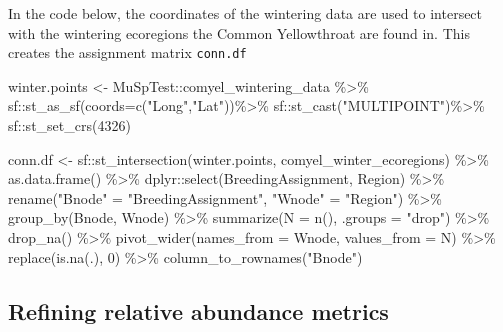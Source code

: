 \documentclass[
]{book}
\newenvironment{Shaded}{\begin{snugshade}}{\end{snugshade}}
\newcommand{\AttributeTok}[1]{\textcolor[rgb]{0.77,0.63,0.00}{#1}}
\newcommand{\DecValTok}[1]{\textcolor[rgb]{0.00,0.00,0.81}{#1}}
\newcommand{\FunctionTok}[1]{\textcolor[rgb]{0.00,0.00,0.00}{#1}}
\newcommand{\NormalTok}[1]{#1}
\newcommand{\OtherTok}[1]{\textcolor[rgb]{0.56,0.35,0.01}{#1}}
\newcommand{\SpecialCharTok}[1]{\textcolor[rgb]{0.00,0.00,0.00}{#1}}
\newcommand{\StringTok}[1]{\textcolor[rgb]{0.31,0.60,0.02}{#1}}
\begin{document}
In the code below, the coordinates of the wintering data are used to intersect with the wintering ecoregions the Common Yellowthroat are found in. This creates the assignment matrix \texttt{conn.df}

\begin{Shaded}
\begin{Highlighting}[]
\NormalTok{winter.points }\OtherTok{\textless{}{-}}\NormalTok{ MuSpTest}\SpecialCharTok{::}\NormalTok{comyel\_wintering\_data }\SpecialCharTok{\%\textgreater{}\%}
\NormalTok{  sf}\SpecialCharTok{::}\FunctionTok{st\_as\_sf}\NormalTok{(}\AttributeTok{coords=}\FunctionTok{c}\NormalTok{(}\StringTok{"Long"}\NormalTok{,}\StringTok{"Lat"}\NormalTok{))}\SpecialCharTok{\%\textgreater{}\%}
\NormalTok{  sf}\SpecialCharTok{::}\FunctionTok{st\_cast}\NormalTok{(}\StringTok{"MULTIPOINT"}\NormalTok{)}\SpecialCharTok{\%\textgreater{}\%}
\NormalTok{  sf}\SpecialCharTok{::}\FunctionTok{st\_set\_crs}\NormalTok{(}\DecValTok{4326}\NormalTok{)}

\NormalTok{conn.df }\OtherTok{\textless{}{-}}\NormalTok{ sf}\SpecialCharTok{::}\FunctionTok{st\_intersection}\NormalTok{(winter.points, comyel\_winter\_ecoregions) }\SpecialCharTok{\%\textgreater{}\%}
  \FunctionTok{as.data.frame}\NormalTok{() }\SpecialCharTok{\%\textgreater{}\%}
\NormalTok{  dplyr}\SpecialCharTok{::}\FunctionTok{select}\NormalTok{(BreedingAssignment, Region) }\SpecialCharTok{\%\textgreater{}\%}
  \FunctionTok{rename}\NormalTok{(}\StringTok{"Bnode"} \OtherTok{=} \StringTok{"BreedingAssignment"}\NormalTok{,}
         \StringTok{"Wnode"} \OtherTok{=} \StringTok{"Region"}\NormalTok{) }\SpecialCharTok{\%\textgreater{}\%}
  \FunctionTok{group\_by}\NormalTok{(Bnode, Wnode) }\SpecialCharTok{\%\textgreater{}\%}
  \FunctionTok{summarize}\NormalTok{(}\AttributeTok{N =} \FunctionTok{n}\NormalTok{(),}
            \AttributeTok{.groups =} \StringTok{"drop"}\NormalTok{) }\SpecialCharTok{\%\textgreater{}\%}
  \FunctionTok{drop\_na}\NormalTok{() }\SpecialCharTok{\%\textgreater{}\%}
  \FunctionTok{pivot\_wider}\NormalTok{(}\AttributeTok{names\_from =}\NormalTok{ Wnode, }\AttributeTok{values\_from =}\NormalTok{ N) }\SpecialCharTok{\%\textgreater{}\%}
  \FunctionTok{replace}\NormalTok{(}\FunctionTok{is.na}\NormalTok{(.), }\DecValTok{0}\NormalTok{) }\SpecialCharTok{\%\textgreater{}\%}
  \FunctionTok{column\_to\_rownames}\NormalTok{(}\StringTok{"Bnode"}\NormalTok{)}
\end{Highlighting}
\end{Shaded}

\hypertarget{refining-relative-abundance-metrics}{%
\subsection{Refining relative abundance metrics}\label{refining-relative-abundance-metrics}}
\end{document}
